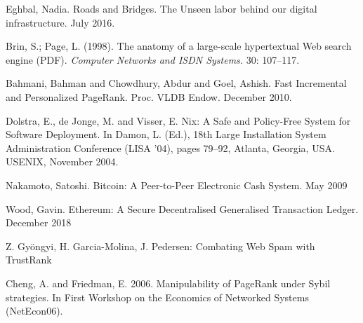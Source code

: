 \documentclass[a4paper, oneside, 10pt, draft]{amsart}
\begin{document}
\setlength{\columnsep}{1cm}
\begin{multicols}{2}

\medskip








\begin{thebibliography}{9}

 Eghbal, Nadia. Roads and Bridges. The Unseen labor
  behind our digital infrastructure. July 2016.

 Brin, S.; Page, L. (1998). The anatomy of a
  large-scale hypertextual Web search engine (PDF). \emph{Computer Networks
  and ISDN Systems.} 30: 107–117.

 Bahmani, Bahman and Chowdhury, Abdur and Goel,
  Ashish. Fast Incremental and Personalized PageRank. Proc. VLDB
  Endow. December 2010.

 Dolstra, E., de Jonge, M. and Visser, E. Nix: A Safe and
  Policy-Free System for Software Deployment. In Damon, L. (Ed.), 18th Large
  Installation System Administration Conference (LISA '04), pages 79–92, Atlanta,
  Georgia, USA. USENIX, November 2004.

 Nakamoto, Satoshi. Bitcoin: A Peer-to-Peer Electronic Cash
  System. May 2009

 Wood, Gavin. Ethereum: A Secure Decentralised Generalised
  Transaction Ledger. December 2018

 Z. Gyöngyi, H. Garcia-Molina, J. Pedersen: Combating Web
  Spam with TrustRank

 Cheng, A. and Friedman, E. 2006. Manipulability of
  PageRank under Sybil strategies. In First Workshop on the Economics of
  Networked Systems (NetEcon06).

\end{thebibliography}

\end{multicols}
\end{document}
